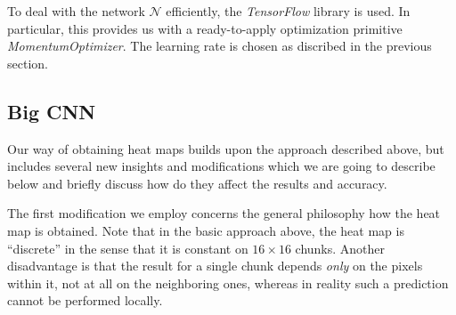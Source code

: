 \documentclass[10pt,conference,compsocconf]{IEEEtran}
\newcommand{\cN}{\mathcal{N}}
\begin{document}
To deal with the network $\cN$ efficiently, the {\it TensorFlow} library is used. In particular, this provides us with a ready-to-apply optimization primitive {\it MomentumOptimizer}. The learning rate is chosen as discribed in the previous section.

\subsection{Big CNN}
Our way of obtaining heat maps builds upon the approach described above, but includes several new insights and modifications which we are going to describe below and briefly discuss how do they affect the results and accuracy.

The first modification we employ concerns the general philosophy how the heat map is obtained. Note that in the basic approach above, the heat map is ``discrete'' in the sense that it is constant on $16 \times 16$ chunks. Another disadvantage is that the result for a single chunk depends \emph{only} on the pixels within it, not at all on the neighboring ones, whereas in reality such a prediction cannot be performed locally.
\end{document}
